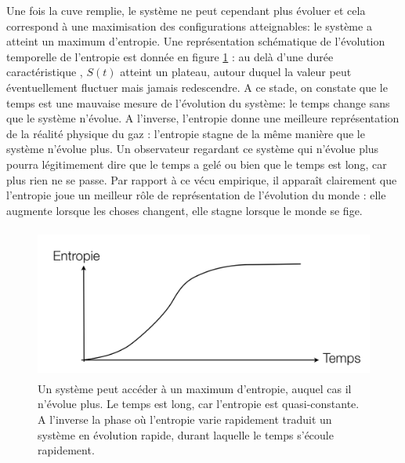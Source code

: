 Une fois la cuve remplie, le système ne peut cependant plus évoluer et cela correspond à une maximisation des configurations atteignables: le système a atteint un maximum d'entropie. Une représentation schématique de l'évolution temporelle de l'entropie est donnée en figure \ref{f:equitemps} : au delà d'une durée caractéristique , $S(t)$ atteint un plateau, autour duquel la valeur peut éventuellement fluctuer mais jamais redescendre. A ce stade, on constate que le temps est une mauvaise mesure de l'évolution du système: le temps change sans que le système n'évolue. A l'inverse, l'entropie donne une meilleure représentation de la réalité physique du gaz : l'entropie stagne de la même manière que le système n'évolue plus. Un observateur regardant ce système qui n'évolue plus pourra légitimement dire que le temps a gelé ou bien que le temps est long, car plus rien ne se passe. Par rapport à ce vécu empirique, il apparaît clairement que l'entropie joue un meilleur rôle de représentation de l'évolution du monde : elle augmente lorsque les choses changent, elle stagne lorsque le monde se fige. 
\begin{figure}[htbp]
	\centering
		\includegraphics[height=5cm]{figs/equientro.png}
	\caption[Évolution vers un maximum d'entropie]{Un système peut accéder à un maximum d'entropie, auquel cas il n'évolue plus. Le temps est long, car l'entropie est quasi-constante. A l'inverse la phase où l'entropie varie rapidement traduit un système en évolution rapide, durant laquelle le temps s'écoule rapidement.}
	\label{f:equitemps}
\end{figure}

